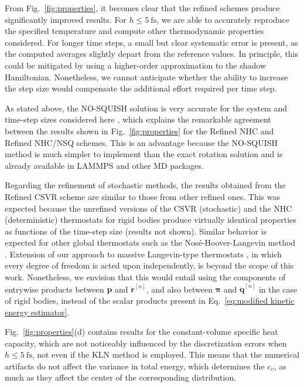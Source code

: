 \documentclass[
	aip,
	jcp,
	reprint,
]{revtex4-1}
\newcommand{\vt}[1]{\boldsymbol{\mathbf{#1}}}          %
\newcommand{\timestep}{h}
\begin{document}
From Fig.~\ref{fig:properties}, it becomes clear that the refined schemes produce significantly improved results. For $\timestep \leq 5~\mathrm{fs}$, we are able to accurately reproduce the specified temperature and compute other thermodynamic properties considered.
For longer time steps, a small but clear systematic error is present, as the computed averages slightly depart from the reference values.
In principle, this could be mitigated by using a higher-order approximation to the shadow Hamiltonian.
Nonetheless, we cannot anticipate whether the ability to increase the step size would compensate the additional effort required per time step.

As stated above, the NO-SQUISH solution \cite{Dullweber_1997, Miller_2002} is very accurate for the system and time-step sizes considered here \cite{Silveira_2017},
which explains the remarkable agreement between the results shown in Fig.~\ref{fig:properties} for the Refined NHC and Refined NHC/NSQ schemes.
This is an advantage because the NO-SQUISH method is much simpler to implement than the exact rotation solution and is already available in LAMMPS \cite{Plimpton_1995} and other MD packages.

Regarding the refinement of stochastic methods, the results obtained from the Refined CSVR scheme are similar to those from other refined ones.
This was expected because the unrefined versions of the CSVR \cite{Bussi_2007} (stochastic) and the NHC \cite{Martyna_1996} (deterministic) thermostats for rigid bodies produce virtually identical properties as functions of the time-step size (results not shown).
Similar behavior is expected for other global thermostats such as the Nos\'{e}-Hoover-Langevin method \cite{Samoletov_2007, Leimkuhler_2009}.
Extension of our approach to massive Langevin-type thermostats \cite{Brunger_1984, Davidchack_2009, Davidchack_2015}, in which every degree of freedom is acted upon independently, is beyond the scope of this work.
Nonetheless, we envision that this would entail using the components of entrywise products between $\vt p$ and $\dot{\vt r}^{[n]}$, and also between ${\vt \pi}$ and $\dot{\vt q}^{[n]}$ in the case of rigid bodies, instead of the scalar products present in Eq.~\eqref{eq:modified kinetic energy estimator}.

Fig.~\ref{fig:properties}(d) contains results for the constant-volume specific heat capacity, which
are not noticeably influenced by the discretization errors when $\timestep \leq 5~\mathrm{fs}$, not even if the KLN method is employed.
This means that the numerical artifacts do not affect the variance in total energy, which determines the $c_v$, as much as they affect the center of the corresponding distribution.
\end{document}
